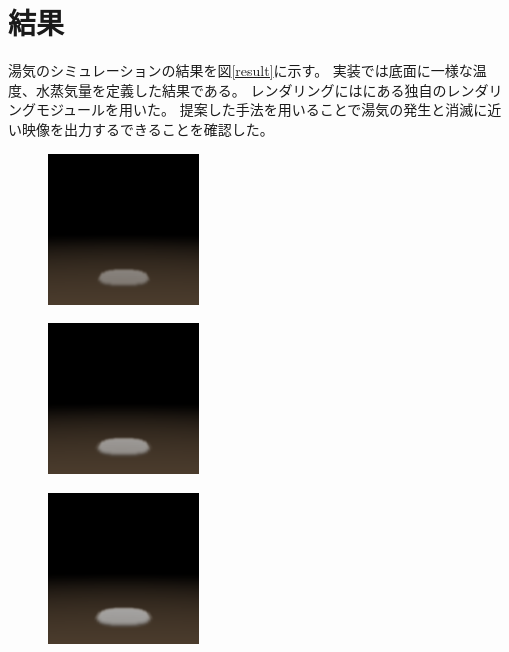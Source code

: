 \section{結果}

湯気のシミュレーションの結果を図\ref{result}に示す。
実装では底面に一様な温度、水蒸気量を定義した結果である。
レンダリングには\cite{smoke3d}にある独自のレンダリングモジュールを用いた。
提案した手法を用いることで湯気の発生と消滅に近い映像を出力するできることを確認した。

\begin{figure}[htbp]
 \begin{minipage}{0.33\hsize}
  \begin{center}
   \includegraphics[width=40mm]{img/render_20.bmp}
  \end{center}
  \label{fig:one}
 \end{minipage}
 \begin{minipage}{0.33\hsize}
 \begin{center}
  \includegraphics[width=40mm]{img/render_30.bmp}
 \end{center}
  \label{fig:two}
 \end{minipage}
 \begin{minipage}{0.33\hsize}
 \begin{center}
  \includegraphics[width=40mm]{img/render_40.bmp}
 \end{center}
  \label{fig:three}
 \end{minipage}
\end{figure}

